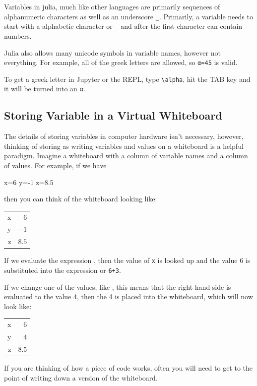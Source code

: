 Variables in julia, much like other languages are primarily sequences of alphanumeric characters as well as an underscore \verb!_!.  Primarily, a variable needs to start with a alphabetic character or \verb!_! and after the first character can contain numbers.  

Julia also allows many unicode symbols in variable names, however not everything.  For example, all of the greek letters are allowed, so \verb!α=45! is valid. 

To get a greek letter in Jupyter or the REPL, type \verb!\alpha!, hit the TAB key and it will be turned into an α.

\subsection{Storing Variable in a Virtual Whiteboard}

The details of storing variables in computer hardware isn't necessary, however, thinking of storing as writing variables and values on a whiteboard is a helpful paradigm.  Imagine a whiteboard with a column of variable names and a column of values.  For example, if we have
\begin{jlblock}[vars]
x=6
y=-1
z=8.5
\end{jlblock}
%
then you can think of the whiteboard looking like:
\begin{center}
\begin{tabular}{r|r} 
x & $6$ \\
y & $-1$ \\
z & $8.5$
\end{tabular}
\end{center}
%
If we evaluate the expression , then the value of \verb!x! is looked up and the value 6 is substituted into the expression or \verb!6+3!.  

If we change one of the values, like , this means that the right hand side is evaluated to the value 4, then the 4 is placed into the whiteboard, which will now look like: 
\begin{center}
\begin{tabular}{r|r} 
x & $6$ \\
y & $4$ \\
z & $8.5$
\end{tabular}
\end{center}
%
If you are thinking of how a piece of code works, often you will need to get to the point of writing down a version of the whiteboard.  


